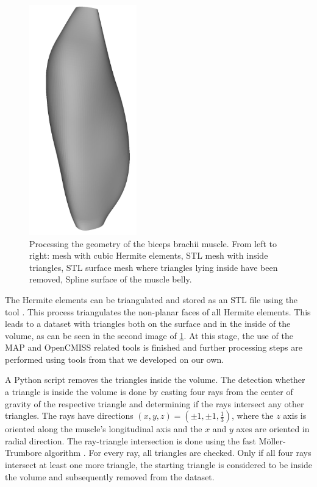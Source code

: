 \begin{figure}
  \includegraphics[height=10cm,trim=-2cm 0 0 -2cm, clip]{images/fiber_creation/splines00.png}%
  \caption{Processing the geometry of the biceps brachii muscle. From left to right: mesh with cubic Hermite elements, STL mesh with inside triangles, STL surface mesh where triangles lying inside have been removed, Spline surface of the muscle belly.}%
  \label{fig:biceps_processing}%
\end{figure}%

The Hermite elements can be triangulated and stored as an STL file using the tool \mbox{.} This process triangulates the non-planar faces of all Hermite elements. This leads to a dataset with triangles both on the surface and in the inside of the volume, as can be seen in the second image of \cref{fig:biceps_processing}. At this stage, the use of the MAP and OpenCMISS related tools is finished and further processing steps are performed using tools from \opendihu{} that we developed on our own.

A Python script removes the triangles inside the volume. The detection whether a triangle is inside the volume is done by casting four rays from the center of gravity of the respective triangle and determining if the rays intersect any other triangles. The rays have directions $(x,y,z) = (\pm1,\pm1,\frac13)$, where the $z$ axis is oriented along the muscle's longitudinal axis and the $x$ and $y$ axes are oriented in radial direction. The ray-triangle intersection is done using the fast Möller-Trumbore algorithm \cite{ray-triangle}. For every ray, all triangles are checked.
Only if all four rays intersect at least one more triangle, the starting triangle is considered to be inside the volume and subsequently removed from the dataset. 

